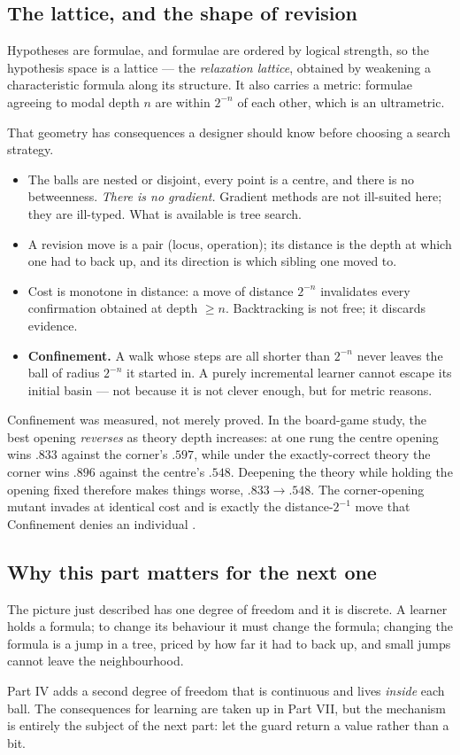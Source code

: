 \subsection{The lattice, and the shape of revision}

Hypotheses are formulae, and formulae are ordered by logical strength, so the
hypothesis space is a lattice --- the \emph{relaxation lattice}, obtained by
weakening a characteristic formula along its structure. It also carries a metric:
formulae agreeing to modal depth $n$ are within $2^{-n}$ of each other, which is
an ultrametric.

That geometry has consequences a designer should know before choosing a search
strategy.

\begin{itemize}[leftmargin=1.4em]
\item The balls are nested or disjoint, every point is a centre, and there is no
betweenness. \emph{There is no gradient.} Gradient methods are not ill-suited
here; they are ill-typed. What is available is tree search.
\item A revision move is a pair (locus, operation); its distance is the depth at
which one had to back up, and its direction is which sibling one moved to.
\item Cost is monotone in distance: a move of distance $2^{-n}$ invalidates every
confirmation obtained at depth $\ge n$. Backtracking is not free; it discards
evidence.
\item \textbf{Confinement.} A walk whose steps are all shorter than $2^{-n}$ never
leaves the ball of radius $2^{-n}$ it started in. A purely incremental learner
cannot escape its initial basin --- not because it is not clever enough, but for
metric reasons.
\end{itemize}

Confinement was measured, not merely proved. In the board-game study, the best
opening \emph{reverses} as theory depth increases: at one rung the centre opening
wins $.833$ against the corner's $.597$, while under the exactly-correct theory the
corner wins $.896$ against the centre's $.548$. Deepening the theory while holding
the opening fixed therefore makes things worse, $.833 \to .548$. The corner-opening
mutant invades at identical cost and is exactly the distance-$2^{-1}$ move that
Confinement denies an individual \cite{GameNote}.

\subsection{Why this part matters for the next one}

The picture just described has one degree of freedom and it is discrete. A learner
holds a formula; to change its behaviour it must change the formula; changing the
formula is a jump in a tree, priced by how far it had to back up, and small jumps
cannot leave the neighbourhood.

Part IV adds a second degree of freedom that is continuous and lives \emph{inside}
each ball. The consequences for learning are taken up in Part VII, but the
mechanism is entirely the subject of the next part: let the guard return a value
rather than a bit.
